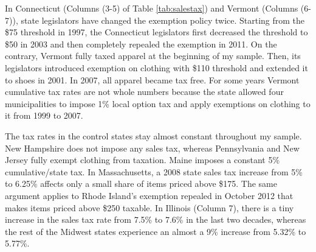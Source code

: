 \documentclass[12pt]{article}
\begin{document}
	In Connecticut (Columns (3-5) of Table \ref{tab:salestax}) and Vermont (Columns (6-7)), state legislators have changed the exemption policy twice. Starting from the \$75 threshold in 1997, the Connecticut legislators first decreased the threshold to \$50 in 2003 and then completely repealed the exemption in 2011. On the contrary, Vermont fully taxed apparel at the beginning of my sample. Then, its legislators introduced exemption on clothing with \$110 threshold and extended it to shoes in 2001. In 2007, all apparel became tax free. For some years Vermont cumulative tax rates are not whole numbers because the state allowed four municipalities to impose 1\% local option tax and apply exemptions on clothing to it from 1999 to 2007.  %
	
	The tax rates in the control states stay almost constant throughout my sample. New Hampshire does not impose any sales tax, whereas Pennsylvania and New Jersey fully exempt clothing from taxation. Maine imposes a constant 5\% cumulative/state tax. In Massachusetts, a 2008 state sales tax increase from 5\% to 6.25\% affects only a small share of items priced above \$175. The same argument applies to Rhode Island's exemption repealed in October 2012 that makes items priced above \$250 taxable. In Illinois (Column 7), there is a tiny increase in the sales tax rate from 7.5\% to 7.6\% in the last two decades, whereas the rest of the Midwest states experience an almost a 9\% increase from 5.32\% to 5.77\%. 
	
	
	
	

		
\end{document}
